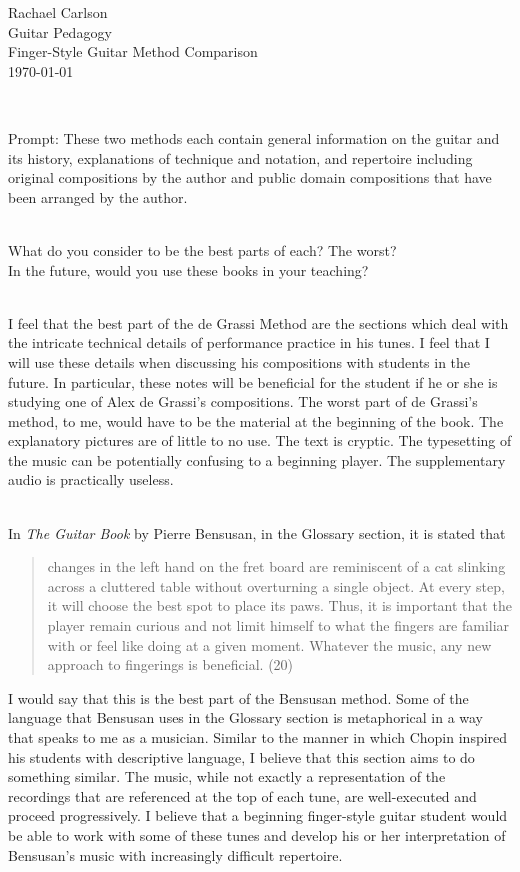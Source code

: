 \documentclass[12pt]{article}
\begin{document}
\noindent Rachael Carlson\\
\noindent Guitar Pedagogy\\
\noindent Finger-Style Guitar Method Comparison\\
\noindent \today\\
\strut\\
\raggedright
\noindent Prompt: These two methods each contain general information on the guitar and its history, explanations of technique and notation, and repertoire including original compositions by the author and public domain compositions that have been arranged by the author.\\
\strut\\
\noindent What do you consider to be the best parts of each? The worst?\\
\noindent In the future, would you use these books in your teaching?\\
\strut\\
\noindent I feel that the best part of the de Grassi Method are the sections which deal with the intricate technical details of performance practice in his tunes. I feel that I will use these details when discussing his compositions with students in the future. In particular, these notes will be beneficial for the student if he or she is studying one of Alex de Grassi's compositions. The worst part of de Grassi's method, to me, would have to be the material at the beginning of the book. The explanatory pictures are of little to no use. The text is cryptic. The typesetting of the music can be potentially confusing to a beginning player. The supplementary audio is practically useless.\\
\strut\\
In \emph{The Guitar Book} by Pierre Bensusan, in the Glossary section, it is stated that
\begin{quote}
changes in the left hand on the fret board are reminiscent of a cat slinking across a cluttered table without overturning a single object. At every step, it will choose the best spot to place its paws. Thus, it is important that the player remain curious and not limit himself to what the fingers are familiar with or feel like doing at a given moment. Whatever the music, any new approach to fingerings is beneficial. (20)
\end{quote}
I would say that this is the best part of the Bensusan method. Some of the language that Bensusan uses in the Glossary section is metaphorical in a way that speaks to me as a musician. Similar to the manner in which Chopin inspired his students with descriptive language, I believe that this section aims to do something similar. The music, while not exactly a representation of the recordings that are referenced at the top of each tune, are well-executed and proceed progressively. I believe that a beginning finger-style guitar student would be able to work with some of these tunes and develop his or her interpretation of Bensusan's music with increasingly difficult repertoire.\\
\end{document}
